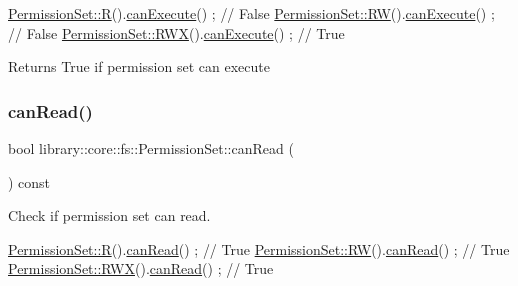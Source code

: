 \begin{DoxyCode}
\hyperlink{classlibrary_1_1core_1_1fs_1_1_permission_set_a48d447273c118d6a7c81aebb505189c6}{PermissionSet::R}().\hyperlink{classlibrary_1_1core_1_1fs_1_1_permission_set_a40da22aa91ee4c8963c1c5434dd8486c}{canExecute}() ; \textcolor{comment}{// False}
\hyperlink{classlibrary_1_1core_1_1fs_1_1_permission_set_a9722204cdc11a0171e1a115d449a134b}{PermissionSet::RW}().\hyperlink{classlibrary_1_1core_1_1fs_1_1_permission_set_a40da22aa91ee4c8963c1c5434dd8486c}{canExecute}() ; \textcolor{comment}{// False}
\hyperlink{classlibrary_1_1core_1_1fs_1_1_permission_set_afa3f9d07a7053240ae97c587543cdb00}{PermissionSet::RWX}().\hyperlink{classlibrary_1_1core_1_1fs_1_1_permission_set_a40da22aa91ee4c8963c1c5434dd8486c}{canExecute}() ; \textcolor{comment}{// True}
\end{DoxyCode}


\begin{DoxyReturn}{Returns}
True if permission set can execute 
\end{DoxyReturn}
\mbox{\label{classlibrary_1_1core_1_1fs_1_1_permission_set_af31f6c5e1bd75102749648fd41882beb}} 
\subsubsection{\texorpdfstring{can\+Read()}{canRead()}}
{\footnotesize\ttfamily bool library\+::core\+::fs\+::\+Permission\+Set\+::can\+Read (\begin{DoxyParamCaption}{ }\end{DoxyParamCaption}) const}



Check if permission set can read. 


\begin{DoxyCode}
\hyperlink{classlibrary_1_1core_1_1fs_1_1_permission_set_a48d447273c118d6a7c81aebb505189c6}{PermissionSet::R}().\hyperlink{classlibrary_1_1core_1_1fs_1_1_permission_set_af31f6c5e1bd75102749648fd41882beb}{canRead}() ; \textcolor{comment}{// True}
\hyperlink{classlibrary_1_1core_1_1fs_1_1_permission_set_a9722204cdc11a0171e1a115d449a134b}{PermissionSet::RW}().\hyperlink{classlibrary_1_1core_1_1fs_1_1_permission_set_af31f6c5e1bd75102749648fd41882beb}{canRead}() ; \textcolor{comment}{// True}
\hyperlink{classlibrary_1_1core_1_1fs_1_1_permission_set_afa3f9d07a7053240ae97c587543cdb00}{PermissionSet::RWX}().\hyperlink{classlibrary_1_1core_1_1fs_1_1_permission_set_af31f6c5e1bd75102749648fd41882beb}{canRead}() ; \textcolor{comment}{// True}
\end{DoxyCode}


